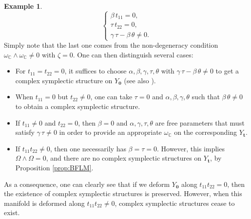 \documentclass[a4paper]{amsart}
\theoremstyle{definition}
\newtheorem{example}[theorem]{Example}
\theoremstyle{remark}
\newcommand{\bC}{{\mathbb C}}
\newcommand{\db}{\operatorname{\overline{\partial}}}
\numberwithin{equation}{section}
\begin{document}
\begin{example}
$$\left\{\begin{array}{l}
\beta\,t_{11}=0,\\
\tau\,t_{22}=0,\\
\gamma\,\tau-\beta\,\theta\neq 0.
\end{array}\right.$$
Simply note that the last one comes from the non-degeneracy condition $\omega_\bC\wedge\omega_\bC\neq 0$ with $\zeta=0$.
One can then distinguish several cases:
\begin{itemize}
\item For $t_{11}=t_{22}=0$, it suffices to choose $\alpha,\beta,\gamma,\tau,\theta$ with $\gamma\,\tau-\beta\,\theta\neq 0$ to get a complex symplectic structure on $Y_{\mathbf 0}$ (see also \cite{Guan1}).
\item When $t_{11}=0$ but $t_{22}\neq 0$, one can take $\tau=0$ and $\alpha,\beta,\gamma,\theta$ such that $\beta\,\theta\neq 0$ to obtain a complex symplectic structure. 
\item If $t_{11}\neq 0$ and $t_{22}=0$, then $\beta=0$ and $\alpha,\gamma,\tau,\theta$ are free parameters that must satisfy $\gamma\,\tau\neq 0$ in order to provide an appropriate $\omega_\bC$ on the corresponding $Y_{\mathbf t}$.

\item If $t_{11}t_{22}\neq 0$, then one necessarily has $\beta=\tau=0$. However, this 
implies $\Omega\wedge\Omega=0$,
and there are no complex symplectic structures on $Y_{\mathbf t}$, by Proposition  \ref{prop:BFLM}.
\end{itemize}
As a consequence, one can clearly see that if we deform $Y_{\mathbf 0}$ along $t_{11}t_{22}=0$, then  the existence of complex symplectic structures is preserved. However, when this manifold is deformed along $t_{11}t_{22}\neq 0$, complex symplectic structures cease to exist.


\end{example}
\end{document}
